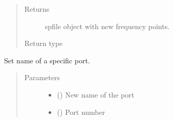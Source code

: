\documentclass[letterpaper,10pt,english]{sphinxmanual}
\begin{document}
\begin{fulllineitems}
\begin{fulllineitems}
\begin{quote}
\begin{description}
\begin{itemize}
\end{itemize}

\item[{Returns}] \leavevmode
spfile object with new frequency points.

\item[{Return type}] \leavevmode
{\hyperref[\detokenize{touchstone:touchstone.spfile}]{}}

\end{description}\end{quote}

\end{fulllineitems}


\begin{fulllineitems}
\label{\detokenize{touchstone:touchstone.spfile.set_inplace}}
\end{fulllineitems}


\begin{fulllineitems}
\label{\detokenize{touchstone:touchstone.spfile.set_port_name}}
Set name of a specific port.
\begin{quote}\begin{description}
\item[{Parameters}] \leavevmode\begin{itemize}
\item {} 
 () \textendash{} New name of the port

\item {} 
 () \textendash{} Port number

\end{itemize}

\end{description}\end{quote}

\end{fulllineitems}


\end{fulllineitems}
\end{document}
